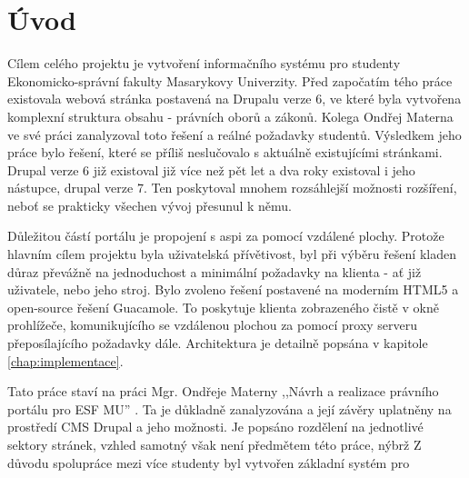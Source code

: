 \documentclass[10pt,draft,oneside]{fithesis2}
\begin{document}



\MainMatter

\tableofcontents

\chapter{Úvod}
Cílem celého projektu je vytvoření informačního systému pro studenty Ekonomicko-správní fakulty Masarykovy Univerzity. Před započatím tého práce existovala webová stránka postavená na Drupalu verze 6, ve které byla vytvořena komplexní struktura obsahu - právních oborů a zákonů. Kolega Ondřej Materna ve své práci zanalyzoval toto řešení a reálné požadavky studentů. Výsledkem jeho práce bylo řešení, které se příliš neslučovalo s aktuálně existujícími stránkami. Drupal verze 6 již existoval již více než pět let a dva roky existoval i jeho nástupce, drupal verze 7\cite{website:wiki:drupal}. Ten poskytoval mnohem rozsáhlejší možnosti rozšíření, neboť se prakticky všechen vývoj přesunul k němu. 

Důležitou částí portálu je propojení s \gls{aspi} za pomocí vzdálené plochy. Protože hlavním cílem projektu byla uživatelská přívětivost, byl při výběru řešení kladen důraz převážně na jednoduchost a minimální požadavky na klienta - ať již uživatele, nebo jeho stroj. Bylo zvoleno řešení postavené na moderním HTML5 a open-source řešení Guacamole. To poskytuje klienta zobrazeného čistě v okně prohlížeče, komunikujícího se vzdálenou plochou za pomocí proxy serveru přeposílajícího požadavky dále. Architektura je detailně popsána v kapitole \ref{chap:implementace}.

Tato práce staví na práci Mgr. Ondřeje Materny ,,Návrh a realizace právního portálu pro ESF MU'' \cite{omaterna2013}. Ta je důkladně zanalyzována a její závěry uplatněny na prostředí CMS Drupal a jeho možnosti. Je popsáno rozdělení na jednotlivé sektory stránek, vzhled samotný však není předmětem této práce, nýbrž %
Z důvodu spolupráce mezi více studenty byl vytvořen základní systém pro 
\end{document}
